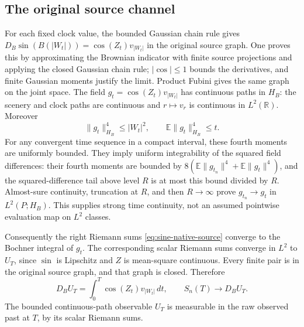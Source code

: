 \documentclass[11pt]{article}
\newcommand{\R}{\mathbb R}\newcommand{\E}{\mathbb E}
\begin{document}
\subsection{The original source channel}
For each fixed clock value, the bounded Gaussian chain rule gives
$D_B\sin(B(|W_t|))=\cos(Z_t)v_{|W_t|}$ in the original source graph.
One proves this by approximating the Brownian indicator with finite
source projections and applying the closed Gaussian chain rule;
$|\cos|\leq1$ bounds the derivatives, and finite Gaussian moments
justify the limit. Product Fubini gives the same graph on the joint
space. The field
$g_t=\cos(Z_t)v_{|W_t|}$ has continuous paths in $H_B$: the scenery
and clock paths are continuous and $r\mapsto v_r$ is continuous in
$L^2(\R)$. Moreover
\[
 \|g_t\|_{H_B}^4\leq|W_t|^2,\qquad
 \E\|g_t\|_{H_B}^4\leq t.
\]
For any convergent time sequence in a compact interval, these fourth
moments are uniformly bounded. They imply uniform integrability of
the squared field differences: their fourth moments are bounded by
$8(\E\|g_{t_n}\|^4+\E\|g_t\|^4)$, and the squared-difference tail
above level $R$ is at most this bound divided by $R$. Almost-sure
continuity, truncation at $R$, and then $R\to\infty$ prove
$g_{t_n}\to g_t$ in $L^2(P;H_B)$. This supplies strong time continuity,
not an assumed pointwise evaluation map on $L^2$ classes.

Consequently the right Riemann sums \eqref{eq:sine-native-source}
converge to the Bochner integral of $g_t$. The corresponding scalar
Riemann sums converge in $L^2$ to $U_T$, since $\sin$ is Lipschitz
and $Z$ is mean-square continuous. Every finite pair is in the
original source graph, and that graph is closed. Therefore
\begin{equation}\label{eq:sine-source-formula}
 D_BU_T=\int_0^T\cos(Z_t)v_{|W_t|}\,dt,
 \qquad S_n(T)\to D_BU_T.
\end{equation}
The bounded continuous-path observable $U_T$ is measurable in the
raw observed past at $T$, by its scalar Riemann sums.
\end{document}
